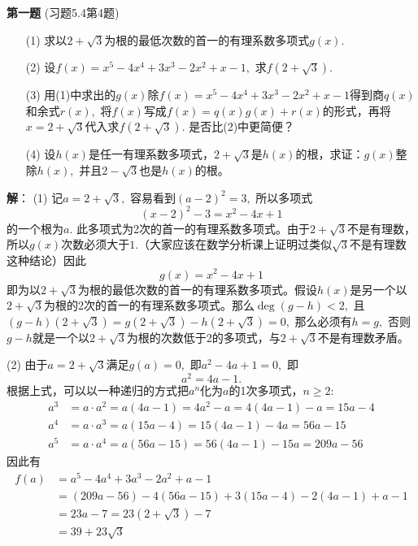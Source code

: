 
\date{2022-12-2 第七次习题课}
\author{}



\maketitle

\ifLargeLayout
\larger[2]
\fi

{\bf 第一题} (习题5.4第4题)
\begin{itemize}
\item[(1)] 求以$2 + \sqrt{3}$为根的最低次数的首一的有理系数多项式$g(x).$
\item[(2)] 设$f(x) = x^5 - 4x^4 + 3x^3 - 2x^2 + x - 1,$ 求$f(2 + \sqrt{3}).$
\item[(3)] 用(1)中求出的$g(x)$除$f(x) = x^5 - 4x^4 + 3x^3 - 2x^2 + x - 1$得到商$q(x)$和余式$r(x),$ 将$f(x)$写成$f(x) = q(x) g(x) + r(x)$的形式，再将$x = 2 + \sqrt{3}$代入求$f(2 + \sqrt{3}).$ 是否比(2)中更简便？
\item[(4)] 设$h(x)$是任一有理系数多项式，$2 + \sqrt{3}$是$h(x)$的根，求证：$g(x)$整除$h(x),$ 并且$2 - \sqrt{3}$也是$h(x)$的根。
\end{itemize}

\ifIncludeAnswer

\newpageorvspace

{\bf 解}： (1) 记$a = 2 + \sqrt{3},$ 容易看到$(a - 2)^2 = 3,$ 所以多项式
$$(x - 2)^2 - 3 = x^2 - 4x + 1$$
的一个根为$a.$ 此多项式为2次的首一的有理系数多项式。由于$2 + \sqrt{3}$不是有理数，所以$g(x)$次数必须大于$1.$（大家应该在数学分析课上证明过类似$\sqrt{3}$不是有理数这种结论）因此
$$g(x) = x^2 - 4x + 1$$
即为以$2 + \sqrt{3}$为根的最低次数的首一的有理系数多项式。假设$h(x)$是另一个以$2 + \sqrt{3}$为根的2次的首一的有理系数多项式。那么$\deg (g - h) < 2,$ 且$(g - h)(2 + \sqrt{3}) = g(2 + \sqrt{3}) - h(2 + \sqrt{3}) = 0,$ 那么必须有$h = g,$ 否则$g - h$就是一个以$2 + \sqrt{3}$为根的次数低于2的多项式，与$2 + \sqrt{3}$不是有理数矛盾。

\vspace{0.5em}

(2) 由于$a = 2 + \sqrt{3}$满足$g(a) = 0,$ 即$a^2 - 4a + 1 = 0,$ 即
$$a^2 = 4a - 1.$$
根据上式，可以以一种递归的方式把$a^n$化为$a$的1次多项式，$n\geqslant 2:$
\begin{align*}
a^3 & = a \cdot a^2 = a(4a - 1) = 4a^2 - a = 4(4a - 1) - a = 15a - 4 \\
a^4 & = a \cdot a^3 = a(15a - 4) = 15(4a - 1) - 4a = 56a - 15 \\
a^5 & = a \cdot a^4 = a(56a - 15) = 56(4a - 1) - 15a = 209a - 56
\end{align*}
因此有
\begin{align*}
f(a) & = a^5 - 4a^4 + 3a^3 - 2a^2 + a - 1 \\
& = (209a - 56) - 4(56a - 15) + 3(15a - 4) - 2(4a - 1) + a - 1 \\
& = 23a - 7 = 23(2 + \sqrt{3}) - 7 \\
& = 39 + 23\sqrt{3}
\end{align*}

